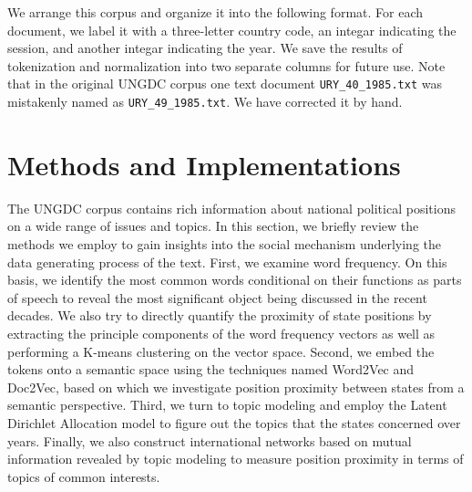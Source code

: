 \documentclass[final,authoryear,3p,12pt,times,hidelinks]{elsarticle}
\begin{document}
We arrange this corpus and organize it into the following format. For each document, we label it with a three-letter country code, an integar indicating the session, and another integar indicating the year. We save the results of tokenization and normalization into two separate columns for future use. Note that in the original UNGDC corpus one text document \texttt{URY\_40\_1985.txt} was mistakenly named as \texttt{URY\_49\_1985.txt}. We have corrected it by hand. 


\section{Methods and Implementations}
\label{sec:Methods}

The UNGDC corpus contains rich information about national political positions on a wide range of issues and topics. In this section, we briefly review the methods we employ to gain insights into the social mechanism underlying the data generating process of the text. First, we examine word frequency. On this basis, we identify the most common words conditional on their functions as parts of speech to reveal the most significant object being discussed in the recent decades. We also try to directly quantify the proximity of state positions by extracting the principle components of the word frequency vectors as well as performing a K-means clustering on the vector space. Second, we embed the tokens onto a semantic space using the techniques named Word2Vec and Doc2Vec, based on which we investigate position proximity between states from a semantic perspective. Third, we turn to topic modeling and employ the Latent Dirichlet Allocation model to figure out the topics that the states concerned over years. Finally, we also construct international networks based on mutual information revealed by topic modeling to measure position proximity in terms of topics of common interests. 
\end{document}
